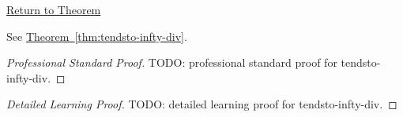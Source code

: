 \newpage
{}
\label{prf:tendsto-infty-div}

\begin{remark*}[Return]
\hyperref[thm:tendsto-infty-div]{Return to Theorem}
\end{remark*}

\begin{theorem*}
See \hyperref[thm:tendsto-infty-div]{Theorem~\ref*{thm:tendsto-infty-div}}.
\end{theorem*}

\begin{proof}[Professional Standard Proof]
\LRAProofBodyStart
TODO: professional standard proof for tendsto-infty-div.
\end{proof}

\begin{proof}[Detailed Learning Proof]
\LRAProofBodyStart
TODO: detailed learning proof for tendsto-infty-div.
\end{proof}

\begin{remark*}
\end{remark*}

\begin{dependencies}
\NoLocalDependencies
\end{dependencies}

\clearpage
